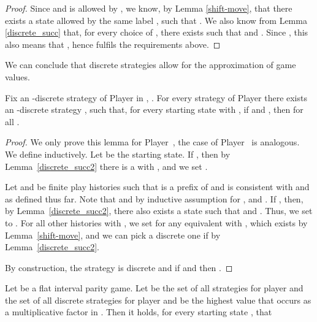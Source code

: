 \documentclass[fleqn,envcountsame]{LMCS}
\newcommand{\pzero}{Player~\xspace}
\newcommand{\pone}{Player~\xspace}
\begin{document}
\begin{proof}
Since  and  is allowed by , we know,
by Lemma \ref{shift-move}, that there exists a state 
allowed by the same label , such that .
We also know from Lemma \ref{discrete_succ} that,
for every choice of , there exists 
such that  and .
Since , this also means that ,
hence  fulfils the requirements above.
\end{proof}

We can conclude that discrete strategies allow for the approximation of game values.

\begin{lem} \label{discrete_strat}
Fix an -discrete strategy  of Player  in ,
. For every strategy  of Player  there
exists an -discrete strategy , such that,
for every starting state  with ,
if  and
,
then  for all .
\end{lem}

\begin{proof}
We only prove this lemma for \pzero, the case of \pone is analogous.
We define  inductively. Let  be the starting state.
If , then by Lemma~\ref{discrete_succ2} there is a
 with ,
and we set .

Let  and  be finite play
histories such that  is a prefix of 
and  is consistent with  and  as defined thus far.
Note that  and by inductive assumption  for
, and .
If , then,
by Lemma~\ref{discrete_succ2}, there also exists 
a state  such that  and 
.
Thus, we set  to .
For all other histories  with ,
we set  for any  equivalent with ,
which exists by Lemma~\ref{shift-move}, and we can pick a discrete one
if  by Lemma~\ref{discrete_succ2}.

By construction, the strategy  is discrete and if
 and
  then .
\end{proof}


\begin{prop} \label{values_close}
Let  be a flat interval parity game. Let  be the set
of all strategies for player  and  the set of all discrete
strategies for player  and  be the highest value that occurs as
a multiplicative factor in . 
Then it holds, for every starting state , that

\end{prop}
\end{document}
